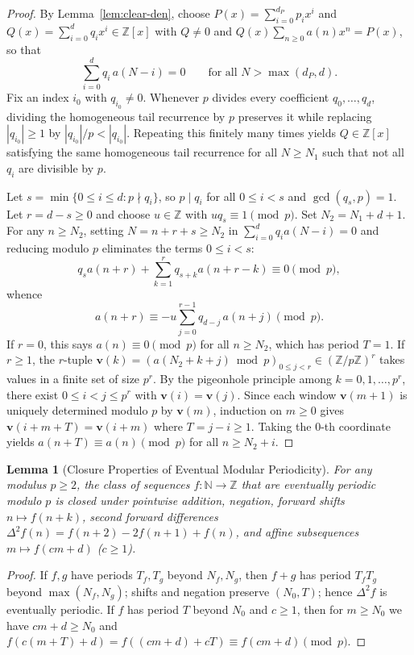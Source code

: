 \documentclass[11pt,a4paper]{article}
\newtheorem{lemma}[theorem]{Lemma}
\theoremstyle{definition}
\newcommand{\N}{\mathbb{N}}
\newcommand{\Z}{\mathbb{Z}}
\begin{document}
\begin{proof}
By Lemma~\ref{lem:clear-den}, choose $P(x) = \sum_{i=0}^{d_P} p_i x^i$ and $Q(x) = \sum_{i=0}^{d} q_i x^i \in \Z[x]$ with $Q \neq 0$ and $Q(x) \sum_{n \ge 0} a(n)x^n = P(x)$, so that
\[
  \sum_{i=0}^{d} q_i\, a(N - i) = 0 \qquad \text{for all } N > \max(d_P, d).
\]
Fix an index $i_0$ with $q_{i_0} \neq 0$. Whenever $p$ divides every coefficient $q_0, \dots, q_d$, dividing the homogeneous tail recurrence by $p$ preserves it while replacing $|q_{i_0}| \ge 1$ by $|q_{i_0}| / p < |q_{i_0}|$. Repeating this finitely many times yields $Q \in \Z[x]$ satisfying the same homogeneous tail recurrence for all $N \ge N_1$ such that not all $q_i$ are divisible by $p$.

Let $s = \min\{0 \le i \le d : p \nmid q_i\}$, so $p \mid q_i$ for all $0 \le i < s$ and $\gcd(q_s, p) = 1$. Let $r = d - s \ge 0$ and choose $u \in \Z$ with $u q_s \equiv 1 \pmod p$. Set $N_2 = N_1 + d + 1$. For any $n \ge N_2$, setting $N = n + r + s \ge N_2$ in $\sum_{i=0}^d q_i a(N - i) = 0$ and reducing modulo $p$ eliminates the terms $0 \le i < s$:
\[
  q_s a(n + r) + \sum_{k=1}^{r} q_{s+k} a(n + r - k) \equiv 0 \pmod p,
\]
whence
\[
  a(n + r) \equiv -u \sum_{j=0}^{r-1} q_{d - j}\, a(n + j) \pmod p.
\]
If $r = 0$, this says $a(n) \equiv 0 \pmod p$ for all $n \ge N_2$, which has period $T = 1$. If $r \ge 1$, the $r$-tuple $\mathbf{v}(k) = (a(N_2 + k + j) \bmod p)_{0 \le j < r} \in (\Z/p\Z)^r$ takes values in a finite set of size $p^r$. By the pigeonhole principle among $k = 0, 1, \dots, p^r$, there exist $0 \le i < j \le p^r$ with $\mathbf{v}(i) = \mathbf{v}(j)$. Since each window $\mathbf{v}(m + 1)$ is uniquely determined modulo $p$ by $\mathbf{v}(m)$, induction on $m \ge 0$ gives $\mathbf{v}(i + m + T) = \mathbf{v}(i + m)$ where $T = j - i \ge 1$. Taking the $0$-th coordinate yields $a(n + T) \equiv a(n) \pmod p$ for all $n \ge N_2 + i$.
\end{proof}

\begin{lemma}[Closure Properties of Eventual Modular Periodicity]
\label{lem:ep-closure}
For any modulus $p \ge 2$, the class of sequences $f : \N \to \Z$ that are eventually periodic modulo $p$ is closed under pointwise addition, negation, forward shifts $n \mapsto f(n + k)$, second forward differences $\Delta^2 f(n) = f(n+2) - 2f(n+1) + f(n)$, and affine subsequences $m \mapsto f(cm + d)$ ($c \ge 1$).
\end{lemma}

\begin{proof}
If $f, g$ have periods $T_f, T_g$ beyond $N_f, N_g$, then $f + g$ has period $T_f T_g$ beyond $\max(N_f, N_g)$; shifts and negation preserve $(N_0, T)$; hence $\Delta^2 f$ is eventually periodic. If $f$ has period $T$ beyond $N_0$ and $c \ge 1$, then for $m \ge N_0$ we have $cm + d \ge N_0$ and $f(c(m + T) + d) = f((cm + d) + cT) \equiv f(cm + d) \pmod p$.
\end{proof}
\end{document}
